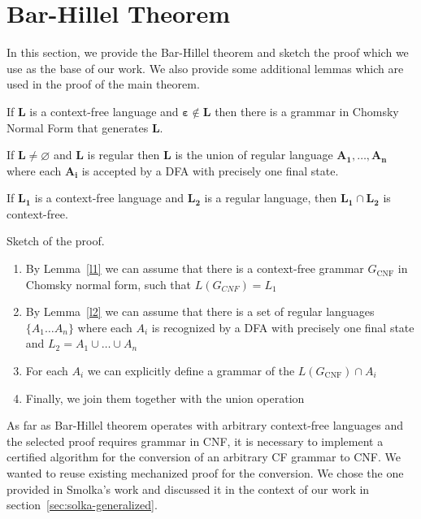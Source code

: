 \section{Bar-Hillel Theorem}
\label{sec:b-h-th}

In this section, we provide the Bar-Hillel theorem and sketch the proof which we use as the base of our work.
We also provide some additional lemmas which are used in the proof of the main theorem.

\begin{lemma} \label{l1}
	If $\boldsymbol{L}$ is a context-free language and $\boldsymbol{\varepsilon} \notin \boldsymbol{L}$ then there is a grammar in Chomsky Normal Form that generates $\boldsymbol{L}$.
\end{lemma}

\begin{lemma} \label{l2}
	If $ \boldsymbol{L} \neq \varnothing $ and $\boldsymbol{L}$ is regular then $\boldsymbol{L}$ is the union of regular language $\boldsymbol{A_1}, \ldots , \boldsymbol{A_n}$ where each $\boldsymbol{A_i}$ is accepted by a DFA with precisely one final state.
\end{lemma}

\begin{theorem}
	If $\boldsymbol{L_1}$ is a context-free language and $\boldsymbol{L_2}$ is a regular language, then $\boldsymbol{L_1} \cap \boldsymbol{L_2}$ is context-free.
\end{theorem}


Sketch of the proof.
\begin{enumerate}
	\item By Lemma~\ref{l1} we can assume that there is a context-free grammar $G_{\text{CNF}}$ in Chomsky normal form, such that $L(G_{CNF}) = L_1$
	\item By Lemma~\ref{l2} we can assume that there is a set of regular languages $\{A_{1} \ldots A_n \}$ where each $A_i$ is recognized by a DFA with precisely one final state and $L_2 = A_1 \cup \ldots \cup A_n$
	\item For each $A_i$ we can explicitly define a grammar of the $L( G_{\text{CNF}} ) \cap A_i$
	\item Finally, we join them together with the union operation
\end{enumerate}

As far as Bar-Hillel theorem operates with arbitrary context-free languages and the selected proof requires grammar in CNF, it is necessary to implement a certified algorithm for the conversion of an arbitrary CF grammar to CNF.
We wanted to reuse existing mechanized proof for the conversion.
We chose the one provided in Smolka's work and discussed it in the context of our work in section~\ref{sec:solka-generalized}.
